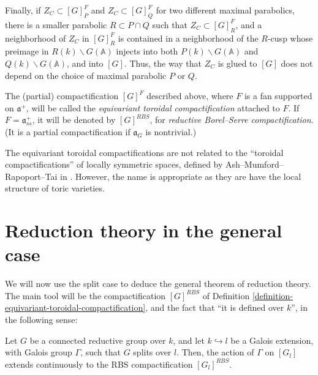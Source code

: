 Finally, if $Z_C\subset [G]_P^F$ and $Z_C\subset [G]_Q^F$ for two different maximal parabolics, there is a smaller parabolic $R\subset P\cap Q$ such that $Z_C\subset [G]_R^F$, and a neighborhood of $Z_C$ in $[G]_R^F$ is contained in a neighborhood of the $R$-cusp whose preimage in $R(k)\backslash G(\mathbb A)$ injects into both $P(k)\backslash G(\mathbb A)$ and $Q(k)\backslash G(\mathbb A)$, and into $[G]$. Thus, the way that $Z_C$ is glued to $[G]$ does not depend on the choice of maximal parabolic $P$ or $Q$.

\begin{definition}
 \label{definition-equivariant-toroidal-compactification}
The (partial) compactification $[G]^F$ described above, where $F$ is a fan supported on $\mathfrak a^+$, will be called the {\it equivariant toroidal compactification} attached to $F$. If $F=\mathfrak a^+_{ss}$, it will be denoted by $[G]^{RBS}$, for {\it reductive Borel--Serre compactification}. (It is a partial compactification if $\mathfrak a_G$ is nontrivial.)
\end{definition}

\begin{remark}
 \label{remark-toroidal-name}
The equivariant toroidal compactifications are not related to the ``toroidal compactifications'' of locally symmetric spaces, defined by Ash--Mumford--Rapoport--Tai in \cite{Ash-Mumford-Rapoport-Tai}. However, the name is appropriate as they are have the local structure of toric varieties. 
\end{remark}






\section{Reduction theory in the general case}
\label{section-reduction-theory-general}

We will now use the split case to deduce the general theorem of reduction theory. The main tool will be the compactification $[G]^{RBS}$ of Definition \ref{definition-equivariant-toroidal-compactification}, and the fact that ``it is defined over $k$'', in the following sense:

\begin{proposition}
 \label{proposition-RBS-Galois-stable}
 Let $G$ be a connected reductive group over $k$, and let $k\hookrightarrow l$ be a Galois extension, with Galois group $\Gamma$, such that $G$ splits over $l$. Then, the action of $\Gamma$ on $[G_l]$ extends continuously to the RBS compactification $[G_l]^{RBS}$.
\end{proposition}

